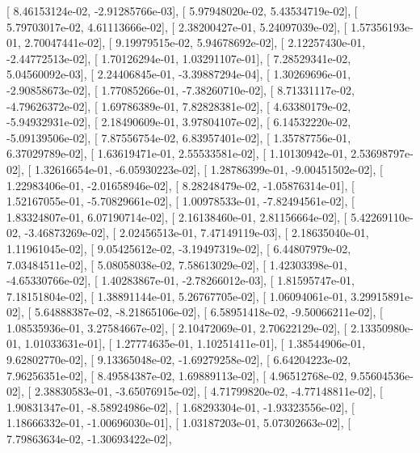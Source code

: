 \documentclass{article}
\begin{document}
       [  8.46153124e-02,  -2.91285766e-03],
       [  5.97948020e-02,   5.43534719e-02],
       [  5.79703017e-02,   4.61113666e-02],
       [  2.38200427e-01,   5.24097039e-02],
       [  1.57356193e-01,   2.70047441e-02],
       [  9.19979515e-02,   5.94678692e-02],
       [  2.12257430e-01,  -2.44772513e-02],
       [  1.70126294e-01,   1.03291107e-01],
       [  7.28529341e-02,   5.04560092e-03],
       [  2.24406845e-01,  -3.39887294e-04],
       [  1.30269696e-01,  -2.90858673e-02],
       [  1.77085266e-01,  -7.38260710e-02],
       [  8.71331117e-02,  -4.79626372e-02],
       [  1.69786389e-01,   7.82828381e-02],
       [  4.63380179e-02,  -5.94932931e-02],
       [  2.18490609e-01,   3.97804107e-02],
       [  6.14532220e-02,  -5.09139506e-02],
       [  7.87556754e-02,   6.83957401e-02],
       [  1.35787756e-01,   6.37029789e-02],
       [  1.63619471e-01,   2.55533581e-02],
       [  1.10130942e-01,   2.53698797e-02],
       [  1.32616654e-01,  -6.05930223e-02],
       [  1.28786399e-01,  -9.00451502e-02],
       [  1.22983406e-01,  -2.01658946e-02],
       [  8.28248479e-02,  -1.05876314e-01],
       [  1.52167055e-01,  -5.70829661e-02],
       [  1.00978533e-01,  -7.82494561e-02],
       [  1.83324807e-01,   6.07190714e-02],
       [  2.16138460e-01,   2.81156664e-02],
       [  5.42269110e-02,  -3.46873269e-02],
       [  2.02456513e-01,   7.47149119e-03],
       [  2.18635040e-01,   1.11961045e-02],
       [  9.05425612e-02,  -3.19497319e-02],
       [  6.44807979e-02,   7.03484511e-02],
       [  5.08058038e-02,   7.58613029e-02],
       [  1.42303398e-01,  -4.65330766e-02],
       [  1.40283867e-01,  -2.78266012e-03],
       [  1.81595747e-01,   7.18151804e-02],
       [  1.38891144e-01,   5.26767705e-02],
       [  1.06094061e-01,   3.29915891e-02],
       [  5.64888387e-02,  -8.21865106e-02],
       [  6.58951418e-02,  -9.50066211e-02],
       [  1.08535936e-01,   3.27584667e-02],
       [  2.10472069e-01,   2.70622129e-02],
       [  2.13350980e-01,   1.01033631e-01],
       [  1.27774635e-01,   1.10251411e-01],
       [  1.38544906e-01,   9.62802770e-02],
       [  9.13365048e-02,  -1.69279258e-02],
       [  6.64204223e-02,   7.96256351e-02],
       [  8.49584387e-02,   1.69889113e-02],
       [  4.96512768e-02,   9.55604536e-02],
       [  2.38830583e-01,  -3.65076915e-02],
       [  4.71799820e-02,  -4.77148811e-02],
       [  1.90831347e-01,  -8.58924986e-02],
       [  1.68293304e-01,  -1.93323556e-02],
       [  1.18666332e-01,  -1.00696030e-01],
       [  1.03187203e-01,   5.07302663e-02],
       [  7.79863634e-02,  -1.30693422e-02],
\end{document}
